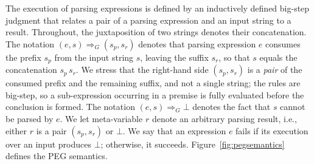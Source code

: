 \documentclass[preprint,12pt]{elsarticle}
\theoremstyle{definition}
\begin{document}
The execution of parsing expressions is defined by an inductively defined
big-step judgment that relates a pair of a parsing expression and an input string
to a result. Throughout, the juxtaposition of two strings denotes their
concatenation. The notation $(e,s) \Rightarrow_G (s_p,s_r)$ denotes that parsing
expression $e$ consumes the prefix $s_p$ from the input string $s$, leaving the
suffix $s_r$, so that $s$ equals the concatenation $s_p\,s_r$. We stress that the
right-hand side $(s_p,s_r)$ is a \emph{pair} of the consumed prefix and the
remaining suffix, and not a single string; the rules are big-step, so a
sub-expression occurring in a premise is fully evaluated before the conclusion is
formed. The notation $(e,s) \Rightarrow_G \bot$ denotes the fact that $s$ cannot be
parsed by $e$. We let meta-variable $r$ denote an arbitrary parsing result, i.e.,
either $r$ is a pair $(s_p,s_r)$ or $\bot$. We say that an expression $e$
fails if its execution over an input produces $\bot$; otherwise, it succeeds.
Figure~\ref{fig:pegsemantics} defines the PEG semantics.
\end{document}
